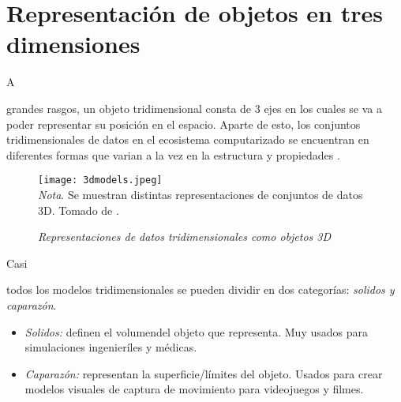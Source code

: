 \documentclass[stu, 12pt, letterpaper, donotrepeattitle, floatsintext, natbib]{apa7}
\begin{document}
    \section{Representación de objetos en tres dimensiones}
    A \begin{justifying}
        grandes rasgos, un objeto tridimensional consta de 3 ejes en los cuales se va a
        poder representar su posición en el espacio. Aparte de esto, los conjuntos tridimensionales de datos
        en el ecosistema computarizado se encuentran en diferentes formas que varian a la vez en la estructura
        y propiedades \citep{poux-2021}.\par %
    \end{justifying}
    \vspace{\baselineskip}
    \begin{figure}[H]
        \caption{\emph{Representaciones de datos tridimensionales como objetos 3D}}
        \centering
        \texttt{[image: 3dmodels.jpeg]}
        \bigskip
    \\\small\textit{Nota}. Se muestran distintas representaciones de conjuntos de datos 3D. Tomado de \cite{poux-2021} . %
    \end{figure}
    Casi \begin{justifying}
        todos los modelos tridimensionales se pueden dividir en dos categorías: \emph{solidos y caparazón}.
        \begin{itemize}
            \item \emph{Solidos:} definen el volumendel objeto que representa. Muy usados para simulaciones ingenieríles y médicas.
            \item \emph{Caparazón:} representan la superficie/límites del objeto. Usados para crear modelos visuales de captura de movimiento para videojuegos y filmes.
        \end{itemize}
    \end{justifying}
    \vspace{\baselineskip}
\end{document}
